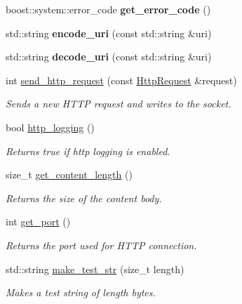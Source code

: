 \begin{DoxyCompactItemize}
boost\+::system\+::error\+\_\+code {\bfseries get\+\_\+error\+\_\+code} ()
\item 
\mbox{\label{class_vessel_1_1_networking_1_1_http_client_a68b254d8debf5b9dd7e5cc27fd5e60fe}} 
std\+::string {\bfseries encode\+\_\+uri} (const std\+::string \&uri)
\item 
\mbox{\label{class_vessel_1_1_networking_1_1_http_client_a42f4fc88293de8997e0ce1405db04cc5}} 
std\+::string {\bfseries decode\+\_\+uri} (const std\+::string \&uri)
\item 
int \hyperlink{class_vessel_1_1_networking_1_1_http_client_a5aa9df2a1026a4aa10b6e4e51931ba04}{send\+\_\+http\+\_\+request} (const \hyperlink{class_vessel_1_1_networking_1_1_http_request}{Http\+Request} \&request)
\begin{DoxyCompactList}\small\item\em Sends a new H\+T\+TP request and writes to the socket. \end{DoxyCompactList}\item 
bool \hyperlink{class_vessel_1_1_networking_1_1_http_client_ad30f53d43a676892ac19ba2f86188ca2}{http\+\_\+logging} ()
\begin{DoxyCompactList}\small\item\em Returns true if http logging is enabled. \end{DoxyCompactList}\item 
size\+\_\+t \hyperlink{class_vessel_1_1_networking_1_1_http_client_a8c236189b1456f690a4315fa98e0d469}{get\+\_\+content\+\_\+length} ()
\begin{DoxyCompactList}\small\item\em Returns the size of the content body. \end{DoxyCompactList}\item 
int \hyperlink{class_vessel_1_1_networking_1_1_http_client_a5ad06cb85c0c5359f46df21182e908e5}{get\+\_\+port} ()
\begin{DoxyCompactList}\small\item\em Returns the port used for H\+T\+TP connection. \end{DoxyCompactList}\item 
std\+::string \hyperlink{class_vessel_1_1_networking_1_1_http_client_a3a32bbeadd12e311c4934c2841c1122d}{make\+\_\+test\+\_\+str} (size\+\_\+t length)
\begin{DoxyCompactList}\small\item\em Makes a test string of length bytes. \end{DoxyCompactList}\item 

\end{DoxyCompactItemize}
